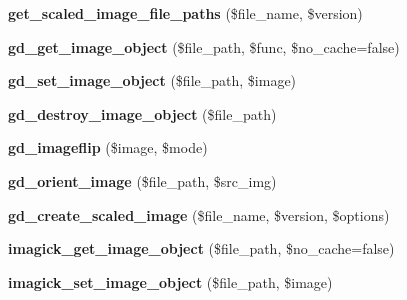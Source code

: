 \begin{DoxyCompactItemize}
\item 
\hypertarget{class_upload_handler_a2af760a58a405fe66b18bdf37f957426}{{\bfseries get\-\_\-scaled\-\_\-image\-\_\-file\-\_\-paths} (\$file\-\_\-name, \$version)}\label{class_upload_handler_a2af760a58a405fe66b18bdf37f957426}

\item 
\hypertarget{class_upload_handler_a3e600c79f487b34d5206c41bb129ff2f}{{\bfseries gd\-\_\-get\-\_\-image\-\_\-object} (\$file\-\_\-path, \$func, \$no\-\_\-cache=false)}\label{class_upload_handler_a3e600c79f487b34d5206c41bb129ff2f}

\item 
\hypertarget{class_upload_handler_a11b39cf0ff461b7246f99f690426ecff}{{\bfseries gd\-\_\-set\-\_\-image\-\_\-object} (\$file\-\_\-path, \$image)}\label{class_upload_handler_a11b39cf0ff461b7246f99f690426ecff}

\item 
\hypertarget{class_upload_handler_a1c419f7991a880ff2dda08e030d5ebf2}{{\bfseries gd\-\_\-destroy\-\_\-image\-\_\-object} (\$file\-\_\-path)}\label{class_upload_handler_a1c419f7991a880ff2dda08e030d5ebf2}

\item 
\hypertarget{class_upload_handler_a4cfbebe756a70da8f67d9b17af532307}{{\bfseries gd\-\_\-imageflip} (\$image, \$mode)}\label{class_upload_handler_a4cfbebe756a70da8f67d9b17af532307}

\item 
\hypertarget{class_upload_handler_a5e5a5d22fdf1f49de8b064f6daca4184}{{\bfseries gd\-\_\-orient\-\_\-image} (\$file\-\_\-path, \$src\-\_\-img)}\label{class_upload_handler_a5e5a5d22fdf1f49de8b064f6daca4184}

\item 
\hypertarget{class_upload_handler_ad9d23a1fda9d09bd4995dbfbf73223e9}{{\bfseries gd\-\_\-create\-\_\-scaled\-\_\-image} (\$file\-\_\-name, \$version, \$options)}\label{class_upload_handler_ad9d23a1fda9d09bd4995dbfbf73223e9}

\item 
\hypertarget{class_upload_handler_a3798f58b7fc8504ec4f89769b6785a75}{{\bfseries imagick\-\_\-get\-\_\-image\-\_\-object} (\$file\-\_\-path, \$no\-\_\-cache=false)}\label{class_upload_handler_a3798f58b7fc8504ec4f89769b6785a75}

\item 
\hypertarget{class_upload_handler_aa899be32e9c6b6d4b9795a05c08fb37c}{{\bfseries imagick\-\_\-set\-\_\-image\-\_\-object} (\$file\-\_\-path, \$image)}\label{class_upload_handler_aa899be32e9c6b6d4b9795a05c08fb37c}


\end{DoxyCompactItemize}
